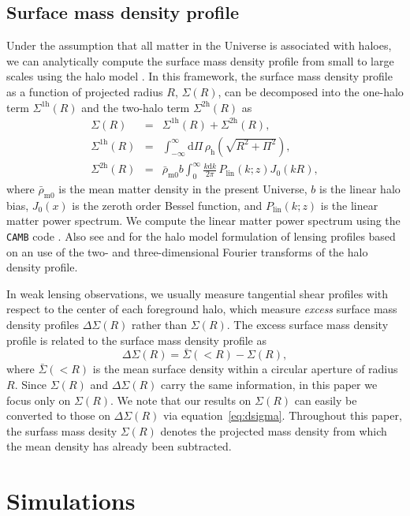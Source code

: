 \documentclass[a4paper,fleqn,usenatbib]{mnras}
\newcommand{\beq}{\begin{equation}}
\newcommand{\eeq}{\end{equation}}
\newcommand{\beqa}{\begin{eqnarray}}
\newcommand{\eeqa}{\end{eqnarray}}
\begin{document}
\subsection{Surface mass density profile}
Under the assumption that all matter in the Universe is associated with haloes,
we can analytically compute the surface mass density profile from
small to large scales using the halo model \citep{Guzik2002,Mandelbaum2005}.
In this framework, the surface mass density profile as a function of
projected radius $R$, $\Sigma(R)$, can be decomposed into the one-halo
term $\Sigma^\mathrm{1h} (R)$ and the two-halo term $\Sigma^\mathrm{2h} (R)$ as
\beqa
\Sigma (R) &=& \Sigma^\mathrm{1h} (R) + \Sigma^\mathrm{2h} (R),
\label{eq:halomodel}\\
\Sigma^\mathrm{1h} (R) &=& \int_{-\infty}^\infty \!\! \mathrm{d}\Pi \,
\rho_\mathrm{h}\left( \sqrt{R^2+\Pi^2} \right) ,
\label{eq:sig1h}\\
\Sigma^\mathrm{2h} (R) &=&
\bar{\rho}_\mathrm{m0}b
\int_0^\infty \!\! \frac{k\mathrm{d}k}{2\pi} \, P_\mathrm{lin}(k ; z) J_0(kR) ,
\label{eq:sig2h}
\eeqa
where $\bar{\rho}_\mathrm{m0}$ is the mean matter density in the present Universe,
$b$ is the linear halo bias, $J_0 (x)$ is the zeroth order Bessel function, and
$P_\mathrm{lin}(k ; z)$ is the linear matter power spectrum.
We compute the linear matter power spectrum using the {\tt CAMB} code
\citep{Lewis2000}.
Also see \cite{Takada2003a} and \cite{OguriTakada:11}
for the halo model formulation of lensing profiles
based on an use of the two- and three-dimensional
Fourier transforms of the halo density profile.

In weak lensing observations, we usually measure tangential shear
profiles with respect to the center of each foreground halo,
which measure {\it excess} surface mass density
profiles $\Delta\Sigma(R)$ rather than $\Sigma(R)$.
The excess surface mass density profile is
related to the surface mass density profile as
\beq
\Delta \Sigma(R) = \bar{\Sigma} (<R) - \Sigma (R),
\label{eq:dsigma}
\eeq
where $\bar{\Sigma}(<R)$ is the mean surface density within
a circular aperture of radius $R$.
Since $\Sigma(R)$ and $\Delta\Sigma(R)$ carry the same information,
in this paper we focus only on $\Sigma(R)$.
We note that our results on $\Sigma(R)$ can easily be converted
to those on $\Delta\Sigma(R)$ via equation~\eqref{eq:dsigma}.
Throughout this paper, the surfass mass desity $\Sigma (R)$ denotes
the projected mass density from which the mean density has already been subtracted.

\section{Simulations}
\label{sec:simulations}
\end{document}
